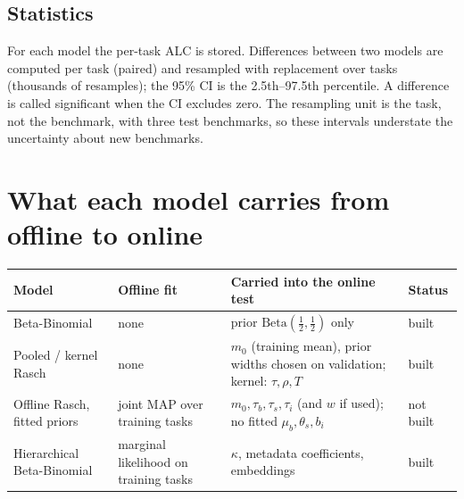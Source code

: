 \documentclass[10pt]{article}
\begin{document}
\subsection{Statistics}
For each model the per-task ALC is stored. Differences between two models are computed per task (paired) and resampled with replacement over tasks (thousands of resamples); the 95\% CI is the 2.5th--97.5th percentile. A difference is called significant when the CI excludes zero. The resampling unit is the task, not the benchmark, with three test benchmarks, so these intervals understate the uncertainty about new benchmarks.

\section{What each model carries from offline to online}
\begin{center}\small
\begin{tabular}{p{3.1cm}p{2.6cm}p{5.6cm}p{2.3cm}}
\toprule
Model & Offline fit & Carried into the online test & Status \\
\midrule
Beta-Binomial & none & prior $\mathrm{Beta}(\tfrac12,\tfrac12)$ only & built \\
Pooled / kernel Rasch & none & $m_0$ (training mean), prior widths chosen on validation; kernel: $\tau,\rho,T$ & built \\
Offline Rasch, fitted priors & joint MAP over training tasks & $m_0,\tau_b,\tau_s,\tau_i$ (and $w$ if used); no fitted $\mu_b,\theta_s,b_i$ & not built \\
Hierarchical Beta-Binomial & marginal likelihood on training tasks & $\kappa$, metadata coefficients, embeddings & built \\
\bottomrule
\end{tabular}
\end{center}
\end{document}
